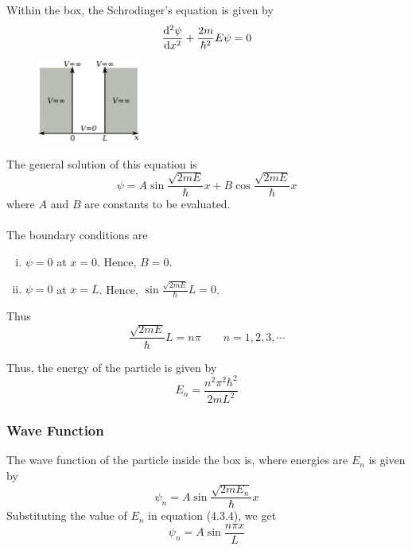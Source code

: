 \documentclass[12pt]{article}
\numberwithin{equation}{subsection}
\begin{document}
Within the box, the Schrodinger's equation is given by
\begin{equation}
    \dv[2]{\psi}{x} + \frac{2m}{\hbar^2} E\psi = 0
\end{equation}

\begin{figure}[htpb]
    \centering
    \includegraphics[width=0.3\textwidth]{potential well.png}
\end{figure}

The general solution of this equation is
\begin{equation}
    \psi = A \sin{\frac{\sqrt{2mE}}{\hbar}x} + B \cos{\frac{\sqrt{2mE}}{\hbar}x}
\end{equation}
where $A$ and $B$ are constants to be evaluated.\\~\\

The boundary conditions are
\begin{enumerate}[(i)]
    \item $\psi=0$ at $x=0$. Hence, $B=0$.
    \item $\psi=0$ at $x=L$. Hence, $\displaystyle \sin{\frac{\sqrt{2mE}}{\hbar}L} = 0$.\\
\end{enumerate}
Thus
\begin{equation}
    \frac{\sqrt{2mE}}{\hbar}L = n\pi \qquad n=1,2,3,\cdots
\end{equation}

Thus, the energy of the particle is given by
\begin{equation}
    \boxed{ E_n = \frac{n^2\pi^2\hbar^2}{2mL^2} }
\end{equation}

\subsubsection{Wave Function}
The wave function of the particle inside the box is, where energies are $E_n$ is given by
\begin{equation}
    \psi_n = A \sin{\frac{\sqrt{2mE_n}}{\hbar}x}
\end{equation}
Substituting the value of $E_n$ in equation (4.3.4), we get
\begin{equation}
    \boxed{ \psi_n = A \sin{\frac{n\pi x}{L}} }
\end{equation}
\end{document}
